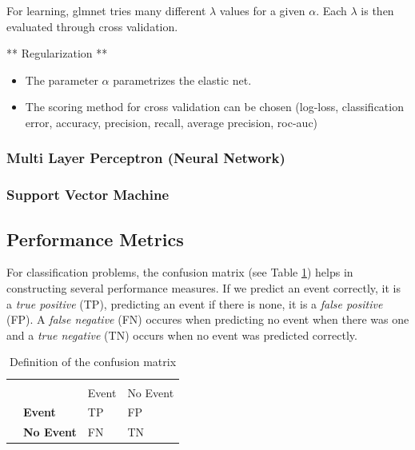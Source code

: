\documentclass[
  11pt,
  a4paper,
  DIV=12,captions=tableheading,oneside]{scrbook}
\providecommand{\tightlist}{%
  \setlength{\itemsep}{0pt}\setlength{\parskip}{0pt}}
\providecommand{\tightlist}{%
  \setlength{\itemsep}{0pt}\setlength{\parskip}{0pt}}
\begin{document}
For learning, glmnet tries many different \(\lambda\) values for a given \(\alpha\). Each \(\lambda\) is then evaluated through cross validation.

** Regularization **

\begin{itemize}
\tightlist
\item
  The parameter \(\alpha\) parametrizes the elastic net.
\item
  The scoring method for cross validation can be chosen (log-loss, classification error, accuracy, precision, recall, average precision, roc-auc)
\end{itemize}

\hypertarget{multi-layer-perceptron-neural-network}{%
\subsubsection{Multi Layer Perceptron (Neural Network)}\label{multi-layer-perceptron-neural-network}}

\hypertarget{support-vector-machine}{%
\subsubsection{Support Vector Machine}\label{support-vector-machine}}

\hypertarget{performance-metrics}{%
\subsection{Performance Metrics}\label{performance-metrics}}

For classification problems, the confusion matrix (see Table \ref{tab:conf-matrix-def}) helps in constructing several performance measures. If we predict an event correctly, it is a \emph{true positive} (TP), predicting an event if there is none, it is a \emph{false positive} (FP). A \emph{false negative} (FN) occures when predicting no event when there was one and a \emph{true negative} (TN) occurs when no event was predicted correctly.

\begin{table}[!h]

\caption{\label{tab:conf-matrix-def}Definition of the confusion matrix}
\centering
\begin{tabular}{>{\bfseries}l>{\bfseries}lll}
\toprule
\multicolumn{2}{c}{ } & \multicolumn{2}{c}{True value} \\
\cmidrule(l{3pt}r{3pt}){3-4}
  &   & Event & No Event\\
\midrule
 & Event & TP & FP\\
\cmidrule{2-4}
\multirow{-2}{*}{\raggedright\arraybackslash Predicted} & No Event & FN & TN\\
\bottomrule
\end{tabular}
\end{table}
\end{document}
